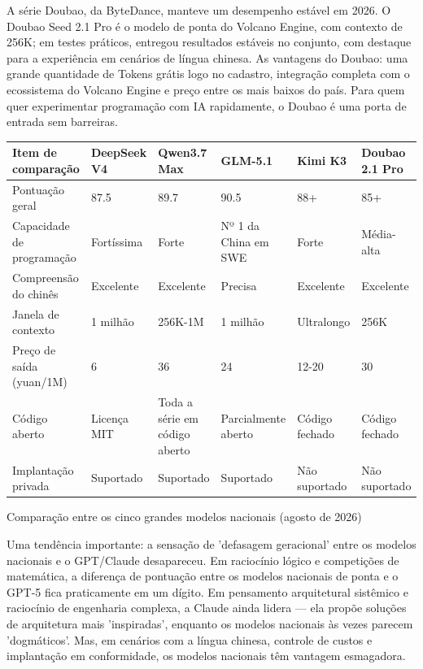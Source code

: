 
A série Doubao, da ByteDance, manteve um desempenho estável em 2026. O Doubao Seed 2.1 Pro é o modelo de ponta do Volcano Engine, com contexto de 256K; em testes práticos, entregou resultados estáveis no conjunto, com destaque para a experiência em cenários de língua chinesa. As vantagens do Doubao: uma grande quantidade de Tokens grátis logo no cadastro, integração completa com o ecossistema do Volcano Engine e preço entre os mais baixos do país. Para quem quer experimentar programação com IA rapidamente, o Doubao é uma porta de entrada sem barreiras.

\begin{center}
\begin{tabularx}{\linewidth}{|X|X|X|X|X|X|}
\hline
\textbf{Item de comparação} & \textbf{DeepSeek V4} & \textbf{Qwen3.7 Max} & \textbf{GLM-5.1} & \textbf{Kimi K3} & \textbf{Doubao 2.1 Pro} \tabularnewline
\hline
Pontuação geral & 87.5 & 89.7 & 90.5 & 88+ & 85+ \tabularnewline
Capacidade de programação & Fortíssima & Forte & Nº 1 da China em SWE & Forte & Média-alta \tabularnewline
Compreensão do chinês & Excelente & Excelente & Precisa & Excelente & Excelente \tabularnewline
Janela de contexto & 1 milhão & 256K-1M & 1 milhão & Ultralongo & 256K \tabularnewline
Preço de saída (yuan/1M) & 6 & 36 & 24 & 12-20 & 30 \tabularnewline
Código aberto & Licença MIT & Toda a série em código aberto & Parcialmente aberto & Código fechado & Código fechado \tabularnewline
Implantação privada & Suportado & Suportado & Suportado & Não suportado & Não suportado \tabularnewline
\hline
\end{tabularx}
\end{center}

\begin{center}\small\color{gray}Comparação entre os cinco grandes modelos nacionais (agosto de 2026)\end{center}

Uma tendência importante: a sensação de 'defasagem geracional' entre os modelos nacionais e o GPT/Claude desapareceu. Em raciocínio lógico e competições de matemática, a diferença de pontuação entre os modelos nacionais de ponta e o GPT-5 fica praticamente em um dígito. Em pensamento arquitetural sistêmico e raciocínio de engenharia complexa, a Claude ainda lidera — ela propõe soluções de arquitetura mais 'inspiradas', enquanto os modelos nacionais às vezes parecem 'dogmáticos'. Mas, em cenários com a língua chinesa, controle de custos e implantação em conformidade, os modelos nacionais têm vantagem esmagadora.

